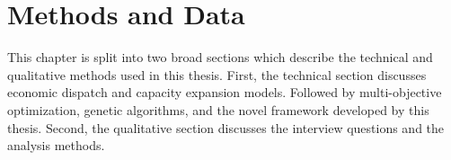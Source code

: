 \chapter{Methods and Data}

This chapter is split into two broad sections which describe the technical
and qualitative methods used in this thesis. First, the technical section
discusses economic dispatch and capacity expansion models. Followed by 
multi-objective optimization, genetic algorithms, and the novel framework
developed by this thesis. Second, the qualitative section discusses the interview
questions and the analysis methods.

